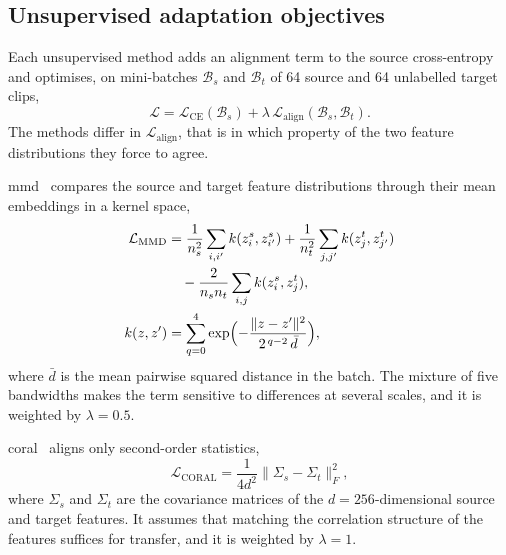 \documentclass[Afour,sagev,times]{sagej}
\begin{document}
\subsection{Unsupervised adaptation objectives}

Each unsupervised method adds an alignment term to the source cross-entropy and
optimises, on mini-batches $\mathcal{B}_s$ and $\mathcal{B}_t$ of 64 source and
64 unlabelled target clips,
\begin{equation}
  \mathcal{L}=\mathcal{L}_{\mathrm{CE}}(\mathcal{B}_s)
  +\lambda\,\mathcal{L}_{\mathrm{align}}(\mathcal{B}_s,\mathcal{B}_t).
  \label{eq:uda}
\end{equation}
The methods differ in $\mathcal{L}_{\mathrm{align}}$, that is in which property
of the two feature distributions they force to agree.

\ac{mmd}~\cite{long2015dan} compares the source and target feature
distributions through their mean embeddings in a kernel space,
\begin{equation}
  \begin{aligned}
  \mathcal{L}_{\mathrm{MMD}}
    &=\frac{1}{n_s^2}\sum_{i,i'}k(z_i^s,z_{i'}^s)
      +\frac{1}{n_t^2}\sum_{j,j'}k(z_j^t,z_{j'}^t)\\
    &\quad-\frac{2}{n_sn_t}\sum_{i,j}k(z_i^s,z_j^t),\\
  k(z,z')&=\sum_{q=0}^{4}\exp\Bigl(-\frac{\|z-z'\|^2}
      {2^{\,q-2}\,\bar{d}}\Bigr),
  \end{aligned}
  \label{eq:mmd}
\end{equation}
where $\bar{d}$ is the mean pairwise squared distance in the batch. The mixture
of five bandwidths makes the term sensitive to differences at several scales,
and it is weighted by $\lambda=0.5$.

\ac{coral}~\cite{sun2016deepcoral} aligns only second-order statistics,
\begin{equation}
  \mathcal{L}_{\mathrm{CORAL}}=\frac{1}{4d^2}\bigl\|\Sigma_s-\Sigma_t\bigr\|_F^2,
  \label{eq:coral}
\end{equation}
where $\Sigma_s$ and $\Sigma_t$ are the covariance matrices of the
$d=256$-dimensional source and target features. It assumes that matching the
correlation structure of the features suffices for transfer, and it is weighted
by $\lambda=1$.
\end{document}

